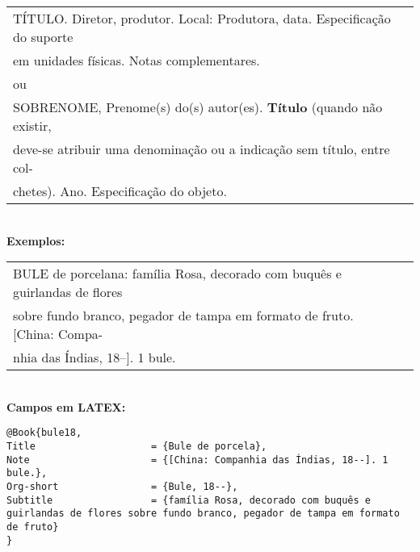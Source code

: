 \begin{tabular}{|l|c|} \hline
	TÍTULO. Diretor, produtor. Local: Produtora, data. Especificação do	suporte \\
	em unidades físicas. Notas complementares.                                    \\
	                                                                               
	ou                                                                             \\	
	                                                                               
	SOBRENOME, Prenome(s) do(s) autor(es). \textbf{Título} (quando não 	existir, \\
	deve-se atribuir uma denominação ou a indicação sem 	título, entre col-   \\
	chetes). Ano. Especificação do objeto.                                       
	                                                                               \\\hline
\end{tabular} \\
	
\textbf{Exemplos:} \\
	
\begin{tabular}{|l|c|} \hline
	BULE de porcelana: família Rosa, decorado com buquês e guirlandas de flores \\ 
	sobre fundo branco, pegador de tampa em formato de fruto. [China: Compa-      \\
	nhia das Índias, 18--]. 1 bule.                                              
	                                                                              \\\hline
\end{tabular} \\
	
\textbf{Campos em LATEX:} 
	
\begingroup
\fontsize{10pt}{12pt}\selectfont
\begin{verbatim}
@Book{bule18,
Title                    = {Bule de porcela},
Note                     = {[China: Companhia das Índias, 18--]. 1 
bule.}, 
Org-short                = {Bule, 18--},
Subtitle                 = {família Rosa, decorado com buquês e 
guirlandas de flores sobre fundo branco, pegador de tampa em formato de fruto}
}
\end{verbatim}
\endgroup
	
